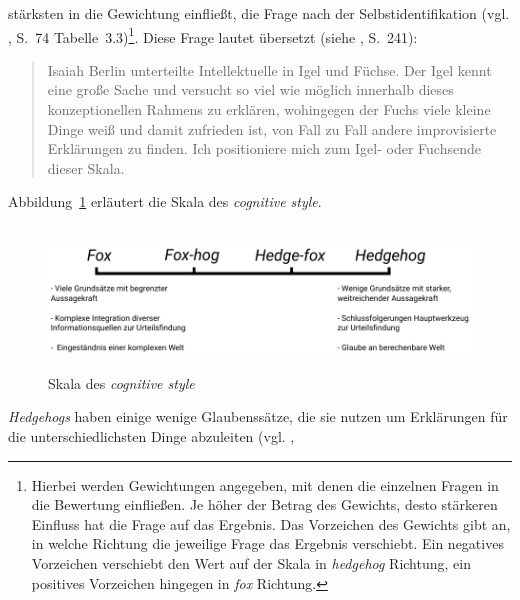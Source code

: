 stärksten in die Gewichtung einfließt, die Frage nach der Selbstidentifikation
(vgl. \cite{Tetlock}, S.~74 Tabelle~3.3)\footnote{
Hierbei werden Gewichtungen angegeben, mit denen die einzelnen Fragen in
die Bewertung einfließen. Je höher der Betrag des Gewichts, desto stärkeren
Einfluss hat die Frage auf das Ergebnis. Das Vorzeichen des Gewichts gibt an,
in welche Richtung die jeweilige Frage das Ergebnis verschiebt. Ein negatives
Vorzeichen verschiebt den Wert auf der Skala in \emph{hedgehog} Richtung, ein
positives Vorzeichen hingegen in \emph{fox} Richtung.   
}. Diese Frage lautet übersetzt (siehe \cite{Tetlock}, S.~241):
\begin{quotation}
Isaiah Berlin unterteilte Intellektuelle in Igel und Füchse. Der Igel kennt eine
große Sache und versucht so viel wie möglich innerhalb dieses konzeptionellen
Rahmens zu erklären, wohingegen der Fuchs viele kleine Dinge weiß und damit
zufrieden ist, von Fall zu Fall andere improvisierte Erklärungen zu
finden. Ich positioniere mich zum Igel- oder Fuchsende dieser Skala.
\end{quotation}
Abbildung~\ref{pic:Hedgehog_Fox} erläutert die Skala des \emph{cognitive style}.
\\ \\
\begin{figure}%
\centering
\caption{Skala des \emph{cognitive style}%
}
\includegraphics[scale=1]{Grafiken/Hedgehog_Fox.pdf} 
\label{pic:Hedgehog_Fox}
\end{figure}
\emph{Hedgehogs} haben einige wenige Glaubenssätze, die sie nutzen um
Erklärungen für die unterschiedlichsten Dinge abzuleiten (vgl. \cite{Tetlock},
